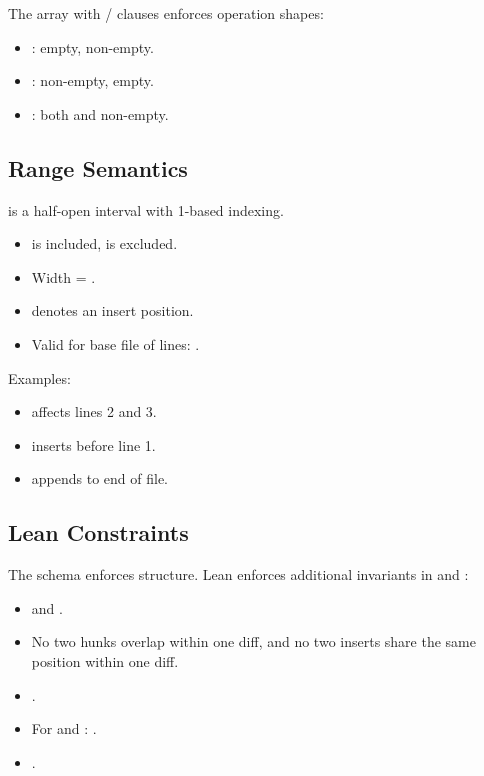The  array with / clauses enforces operation shapes:
\begin{itemize}
  \item {}:  empty,  non-empty.
  \item {}:  non-empty,  empty.
  \item {}: both  and  non-empty.
\end{itemize}

\subsection{Range Semantics}

 is a half-open interval \code{[start, stop)} with 1-based indexing.

\begin{itemize}
  \item {} is included,  is excluded.
  \item Width = .
  \item {} denotes an insert position.
  \item Valid for base file of  lines: .
\end{itemize}

Examples:
\begin{itemize}
  \item \code{[2,4]} affects lines 2 and 3.
  \item \code{[1,1]} inserts before line 1.
  \item \code{[N+1,N+1]} appends to end of file.
\end{itemize}

\subsection{Lean Constraints}

The schema enforces structure. Lean enforces additional invariants in  and :

\begin{itemize}
  \item {} and .
  \item No two hunks overlap within one diff, and no two inserts share the same position within one diff.
  \item {}.
  \item For  and : .
  \item {}.
\end{itemize}

